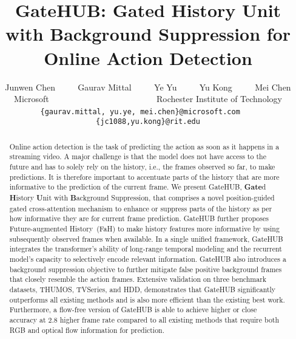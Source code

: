 \documentclass[10pt,twocolumn,letterpaper]{article}
\begin{document}
\title{GateHUB: Gated History Unit with Background Suppression for Online Action Detection}










\author{Junwen Chen ~~~~ Gaurav Mittal ~~~~ Ye Yu ~~~~ Yu Kong ~~~~  Mei Chen\\
Microsoft ~~~~~~~~~~~~~~~~~~~~~~~~ Rochester Institute of Technology\\
{\tt\small \{gaurav.mittal, yu.ye, mei.chen\}@microsoft.com} ~~~
{\tt\small \{jc1088,yu.kong\}@rit.edu}
}
\maketitle

\begin{abstract}
\vspace{-0.5em}
Online action detection is the task of predicting the action as soon as it happens in a streaming video. A major challenge is that the model does not have access to the future and has to solely rely on the history, i.e., the frames observed so far, to make predictions.
It is therefore important to accentuate parts of the history that are more informative to the prediction of the current frame.
We present GateHUB, \textbf{Gate}d \textbf{H}istory \textbf{U}nit with \textbf{B}ackground Suppression, that comprises a novel position-guided gated cross-attention mechanism to enhance or suppress parts of the history as per how informative they are for current frame prediction. 
GateHUB further proposes Future-augmented History~(FaH) to make history features more informative by using subsequently observed frames when available.
In a single unified framework, GateHUB integrates the transformer's ability of long-range temporal modeling and the recurrent model's capacity to selectively encode relevant information. 
GateHUB also introduces a background suppression objective to further mitigate false positive background frames that closely resemble the action frames.
Extensive validation on three benchmark datasets, THUMOS, TVSeries, and HDD, demonstrates that 
GateHUB significantly outperforms all existing methods and is also more efficient than the existing best work.
Furthermore, a flow-free version of GateHUB is able to achieve higher or close accuracy at 2.8 higher frame rate compared to all existing methods that require both RGB and optical flow information for prediction.






\end{abstract}
\end{document}
